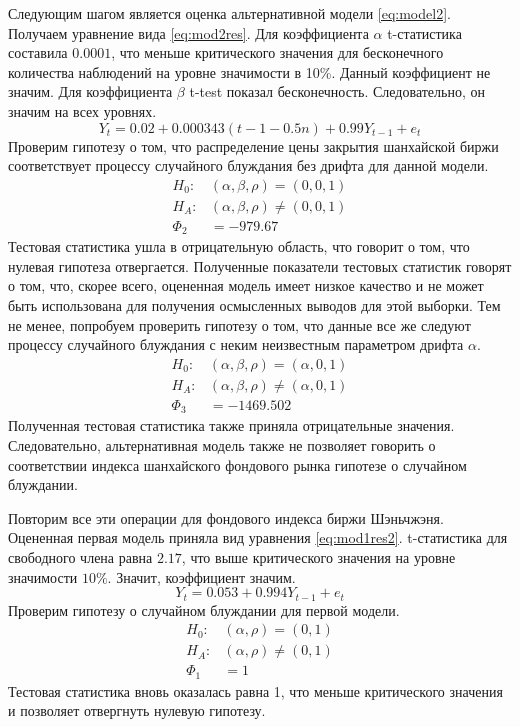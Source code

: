 \documentclass[a4paper,12pt]{article}
\begin{document}
Следующим шагом является оценка альтернативной модели \ref{eq:model2}. Получаем уравнение вида \ref{eq:mod2res}. Для коэффициента $\alpha$ t-статистика составила $0.0001$, что меньше критического значения для бесконечного количества наблюдений на уровне значимости в 10\%. Данный коэффициент не значим. Для коэффициента $\beta$ t-test показал бесконечность. Следовательно, он значим на всех уровнях.
\begin{equation}
  \label{eq:mod2res}
  Y_t=0.02+0.000343(t-1-0.5n)+0.99Y_{t-1}+e_t
\end{equation}
Проверим гипотезу о том, что распределение цены закрытия шанхайской биржи соответствует процессу случайного блуждания без дрифта для данной модели.
\begin{align}
  H_0:&(\alpha, \beta, \rho)=(0,0,1)\\
  H_A:&(\alpha,\beta, \rho)\neq(0,0,1)\\
  \Phi_2&=-979.67
\end{align}
Тестовая статистика ушла в отрицательную область, что говорит о том, что нулевая гипотеза отвергается. Полученные показатели тестовых статистик говорят о том, что, скорее всего, оцененная модель имеет низкое качество и не может быть использована для получения осмысленных выводов для этой выборки. Тем не менее, попробуем проверить гипотезу о том, что данные все же следуют процессу случайного блуждания с неким неизвестным параметром дрифта $\alpha$.
\begin{align}
  H_0:&(\alpha, \beta, \rho)=(\alpha,0,1)\\
  H_A:&(\alpha,\beta, \rho)\neq(\alpha,0,1)\\
  \Phi_3&=-1469.502
\end{align}
Полученная тестовая статистика также приняла отрицательные значения. Следовательно, альтернативная модель также не позволяет говорить о соответствии индекса шанхайского фондового рынка гипотезе о случайном блуждании.

Повторим все эти операции для фондового индекса биржи Шэньчжэня. Оцененная первая модель приняла вид уравнения \ref{eq:mod1res2}. t-статистика для свободного члена равна $2.17$, что выше критического значения на уровне значимости $10\%$. Значит, коэффициент значим.
\begin{equation}
  \label{eq:mod1res2}
  Y_t=0.053+0.994Y_{t-1}+e_t
\end{equation}
Проверим гипотезу о случайном блуждании для первой модели.
\begin{align}
  H_0:&(\alpha,\rho)=(0,1)\\
  H_A:&(\alpha,\rho)\neq(0,1)\\
  \Phi_1&=1
\end{align}
Тестовая статистика вновь оказалась равна 1, что меньше критического значения и позволяет отвергнуть нулевую гипотезу.
\end{document}
